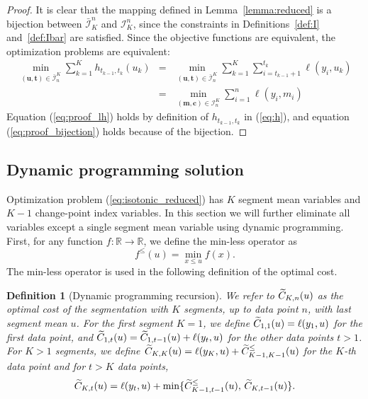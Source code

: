 \documentclass{article}
\newtheorem{definition}{Definition}
\newcommand{\RR}{\mathbb R}
\begin{document}
\begin{proof}
  It is clear that the mapping defined in Lemma~\ref{lemma:reduced} is
  a bijection between $\bar{\mathcal I}_K^n$ and $\mathcal I_K^n$,
  since the constraints in Definitions~\ref{def:I} and~\ref{def:Ibar}
  are satisfied. Since the objective functions are equivalent, the
  optimization problems are equivalent:
  \begin{eqnarray}
  \min_{(\mathbf u, \mathbf t)\in\bar{\mathcal I}_n^K}
  \sum_{k=1}^K
  h_{t_{k-1}, t_k}(u_k) 
    &=& \label{eq:proof_lh}
  \min_{(\mathbf u, \mathbf t)\in\bar{\mathcal I}_n^K}
\sum_{k=1}^K 
        \sum_{i=t_{k-1}+1}^{t_k} \ell(y_i, u_k)\\
    &=& \label{eq:proof_bijection}
  \min_{(\mathbf m, \mathbf c)\in\mathcal I_n^K}
        \sum_{i=1}^{n} \ell(y_i, m_i)
  \end{eqnarray}
  Equation (\ref{eq:proof_lh}) holds by definition of
  $h_{t_{k-1},t_k}$ in (\ref{eq:h}), and equation
  (\ref{eq:proof_bijection}) holds because of the bijection.
\end{proof}

\subsection{Dynamic programming solution}

Optimization problem (\ref{eq:isotonic_reduced}) has $K$ segment mean
variables and $K-1$ change-point index variables. In this section we
will further eliminate all variables except a single segment mean
variable using dynamic programming. First, for any function
$f:\RR\rightarrow\RR$, we define the min-less operator as
\begin{equation}
  \label{eq:min-less-def}
  f^\leq(u)=\min_{x\leq u} f(x).
\end{equation}
The min-less operator is used in the following definition of the
optimal cost.
\begin{definition}[Dynamic programming recursion]
\label{def:fcc}
  We refer to $\widetilde{C}_{K,n}(u)$ as the optimal cost of the segmentation
  with $K$ segments, up to data point $n$, with last segment mean
  $u$. For the first segment $K=1$, we define
  $\widetilde{C}_{1,1}(u)=\ell(y_1,u)$ for the first data point, and
  $\widetilde{C}_{1,t}(u)=\widetilde{C}_{1,t-1}(u)+\ell(y_t,u)$ for the other data
  points $t>1$. For $K>1$ segments, we define
  $\widetilde{C}_{K,K}(u)=\ell(y_K, u)+\widetilde{C}_{K-1,K-1}^\leq(u)$ for the $K$-th
  data point and for $t>K$ data points,
  \begin{equation}
\nonumber
  \widetilde{C}_{K,t}(u)=\ell(y_t,u)+
  \min\{
  \widetilde{C}_{K-1,t-1}^\leq(u),\,
  \widetilde{C}_{K,t-1}(u)
  \}.
  \end{equation}
\end{definition}
\end{document}
